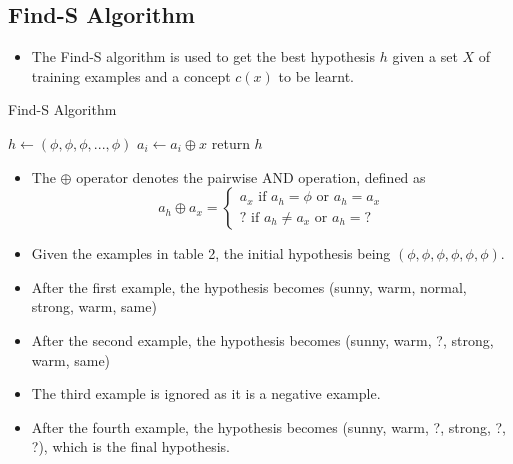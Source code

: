 \documentclass{article}
\theoremstyle{plain}
\theoremstyle{definition}
\begin{document}
\subsection{Find-S Algorithm}
\begin{itemize}
    \item The Find-S algorithm is used to get the best hypothesis $h$ given a set $X$ of training examples and a concept $c(x)$ to be learnt. 
\end{itemize}

\begin{algorithm}[H]
        \caption{Find-S Algorithm}
        \begin{algorithmic}
            \State $h \gets (\phi, \phi, \phi, ..., \phi)$
                  
                        \State $a_i \gets a_i \oplus x$
                    \EndFor
                \EndIf
            \EndFor
            \State return $h$
        \EndProcedure
    \end{algorithmic}
\end{algorithm}

\begin{itemize}
    
    \item The $\oplus$ operator denotes the pairwise AND operation, defined as
    \[ a_h \oplus a_x = 
    \begin{cases}
     a_x \text{ if } a_h = \phi \text{ or } a_h = a_x\\
     
     ? \text{ if } a_h \neq a_x \text{ or } a_h = ?
     
    \end{cases}
    \]
    \item Given the examples in table 2, the initial hypothesis being $(\phi, \phi, \phi, \phi, \phi, \phi)$.
    
    \item After the first example, the hypothesis becomes (sunny, warm, normal, strong, warm, same)
    
    \item After the second example, the hypothesis becomes (sunny, warm, ?, strong, warm, same)
    
    \item The third example is ignored as it is a negative example.
    
    \item After the fourth example, the hypothesis becomes (sunny, warm, ?, strong, ?, ?), which is the final hypothesis.
\end{itemize}
\end{document}
